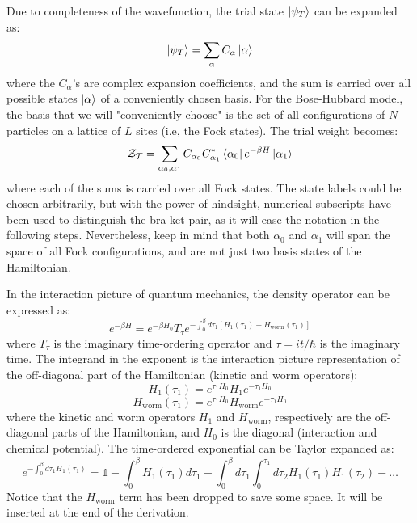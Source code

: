 \documentclass[12pt, two sided]{article}
\begin{document}
Due to completeness of the wavefunction, the trial state $\ket{\psi_T}$ can be expanded as:
%
\begin{equation}
\ket{\psi_T} = \sum_{\alpha} C_{\alpha} \ket{\alpha}
\end{equation}
%
where the $C_\alpha$'s are complex expansion coefficients, and the sum is carried over all possible states $\ket{\alpha}$ of a conveniently chosen basis. For the Bose-Hubbard model, the basis that we will "conveniently choose" is the set of all configurations of $N$ particles on a lattice of $L$ sites (i.e, the Fock states). The trial weight becomes:
%
\begin{equation}
\mathcal{Z_T} = \sum_{\alpha_0, \alpha_1} C_{\alpha_0} C_{\alpha_1}^{*} \bra{\alpha_0} e^{-\beta H} \ket{\alpha_1}
\end{equation}
%
where each of the sums is carried over all Fock states. The state labels could be chosen arbitrarily, but with the power of hindsight, numerical subscripts have been used to distinguish the bra-ket pair, as it will ease the notation in the following steps. Nevertheless, keep in mind that both $\alpha_0$ and $\alpha_1$ will span the space of all Fock configurations, and are not just two basis states of the Hamiltonian.

In the interaction picture of quantum mechanics, the density operator can be expressed as:
%
\begin{equation}
\label{eq:density_op_01}
e^{-\beta H} = e^{-\beta H_0} T_{\tau} e^{- \int_0^{\beta} d\tau_1 [ H_1(\tau_1) + H_\mathrm{worm}(\tau_1) ] }
\end{equation}
where $T_{\tau}$ is the imaginary time-ordering operator and $\tau = it/\hbar$ is the imaginary time. The integrand in the exponent is the interaction picture representation of the off-diagonal part of the Hamiltonian (kinetic and worm operators):
%
\begin{equation}
H_1(\tau_1) = e^{\tau_1 H_0} H_1 e^{-\tau_1 H_0}
\end{equation}
%
%
\begin{equation}
H_\mathrm{worm}(\tau_1) = e^{\tau_1 H_0} H_\mathrm{worm} e^{-\tau_1 H_0}
\end{equation}
%
where the kinetic and worm operators $H_1$ and $H_\mathrm{worm}$, respectively are the off-diagonal parts of the Hamiltonian, and $H_0$ is the diagonal (interaction and chemical potential). The time-ordered exponential can be Taylor expanded as:
\begin{equation}
e^{- \int_0^{\beta} d\tau_1 H_1(\tau_1)} = \mathds{1} - \int_{0}^{\beta} H_1(\tau_1) d\tau_1 + \int_0^{\beta} d\tau_1 \int_{0}^{\tau_1} d\tau_2 H_1(\tau_1) H_1(\tau_2) - \dots 
\end{equation}
%
Notice that the $H_\mathrm{worm}$ term has been dropped to save some space. It will be inserted at the end of the derivation.
\end{document}
